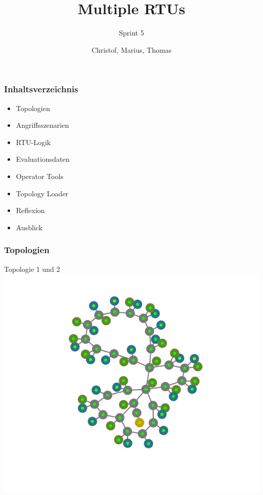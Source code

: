 \documentclass{beamer}
\author{Christof, Marius, Thomas}
\title{Multiple RTUs}
\subtitle{Sprint 5}
\begin{document}
%



\begin{frame}[plain]
	\maketitle
\end{frame}

\begin{frame}
	\frametitle{Inhaltsverzeichnis}
	\begin{itemize}
		\item Topologien
		\item Angriffsszenarien
		\item RTU-Logik
		\item Evaluationsdaten
		\item Operator Tools
		\item Topology Loader
		\item Reflexion
		\item Ausblick
	\end{itemize}
\end{frame}

\begin{frame}
	\frametitle{Topologien}
	\centering
	Topologie 1 und 2
	\includegraphics[height=\textheight]{pics/topo_1_2.png}
\end{frame}
\end{document}
